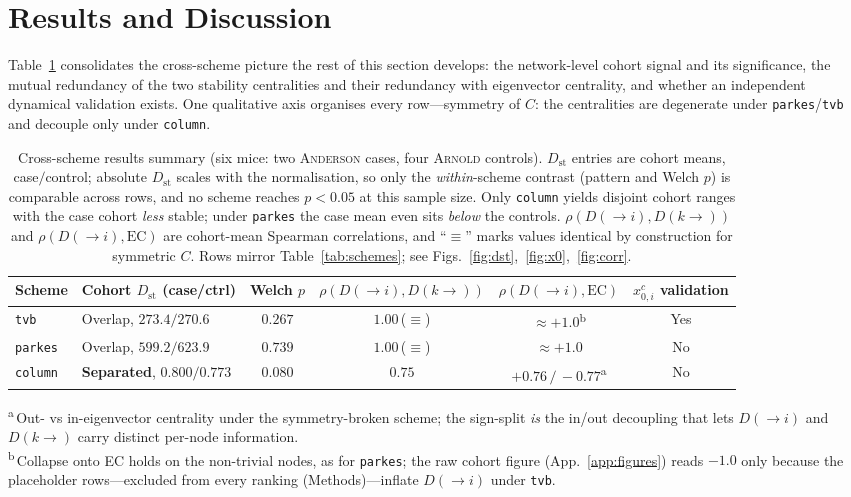 \documentclass[11pt,a4paper]{article}
\newcommand{\Dst}{D_{\mathrm{st}}}
\newcommand{\Dto}{D(\!\to\! i)}
\newcommand{\Dfrom}{D(k\!\to\!)}
\newcommand{\xcrit}{x_{0,i}^{c}}
\begin{document}
\section{Results and Discussion}

Table~\ref{tab:results} consolidates the cross-scheme picture the rest of this section develops: the
network-level cohort signal and its significance, the mutual redundancy of the two stability
centralities and their redundancy with eigenvector centrality, and whether an independent dynamical
validation exists. One qualitative axis organises every row---symmetry of $C$: the centralities are
degenerate under \texttt{parkes}/\texttt{tvb} and decouple only under \texttt{column}.

\begin{table}[H]
\centering
\caption{Cross-scheme results summary (six mice: two \textsc{Anderson} cases, four \textsc{Arnold}
controls). $\Dst$ entries are cohort means, case$/$control; absolute $\Dst$ scales with the
normalisation, so only the \emph{within}-scheme contrast (pattern and Welch $p$) is comparable across
rows, and no scheme reaches $p<0.05$ at this sample size. Only \texttt{column} yields disjoint cohort
ranges with the case cohort \emph{less} stable; under \texttt{parkes} the case mean even sits
\emph{below} the controls. $\rho(\Dto,\Dfrom)$ and $\rho(\Dto,\mathrm{EC})$ are cohort-mean Spearman
correlations, and ``$\equiv$'' marks values identical by construction for symmetric $C$. Rows mirror
Table~\ref{tab:schemes}; see Figs.~\ref{fig:dst},~\ref{fig:x0},~\ref{fig:corr}.}
\label{tab:results}
\small
\setlength{\tabcolsep}{5pt}
\begin{tabular}{@{}llcccc@{}}
\toprule
Scheme & Cohort $\Dst$ (case/ctrl) & Welch $p$ & $\rho(\Dto,\Dfrom)$ & $\rho(\Dto,\mathrm{EC})$ & $\xcrit$ validation \\
\midrule
\texttt{tvb}    & Overlap, $273.4/270.6$            & $0.267$ & $1.00$\,($\equiv$) & $\approx{+}1.0$\textsuperscript{b} & Yes \\
\texttt{parkes} & Overlap, $599.2/623.9$            & $0.739$ & $1.00$\,($\equiv$) & $\approx{+}1.0$                    & No  \\
\texttt{column} & \textbf{Separated}, $0.800/0.773$ & $0.080$ & $0.75$             & ${+}0.76\,/\,{-}0.77$\textsuperscript{a} & No  \\
\bottomrule
\end{tabular}

\smallskip
{\footnotesize
\textsuperscript{a}\,Out- vs in-eigenvector centrality under the symmetry-broken scheme; the
sign-split \emph{is} the in/out decoupling that lets $\Dto$ and $\Dfrom$ carry distinct per-node
information.\\
\textsuperscript{b}\,Collapse onto EC holds on the non-trivial nodes, as for \texttt{parkes}; the raw
cohort figure (App.~\ref{app:figures}) reads $-1.0$ only because the placeholder rows---excluded from
every ranking (Methods)---inflate $\Dto$ under \texttt{tvb}.\par}
\end{table}
\end{document}
